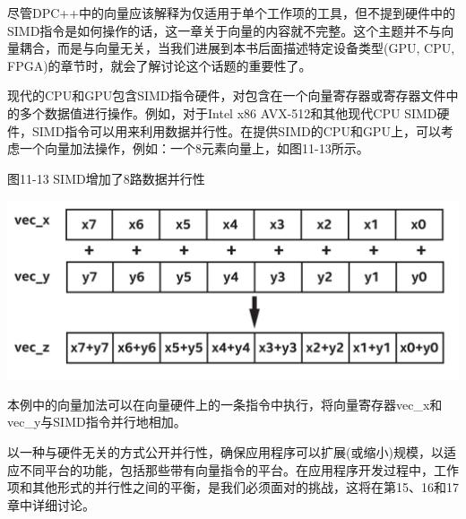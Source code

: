 尽管DPC++中的向量应该解释为仅适用于单个工作项的工具，但不提到硬件中的SIMD指令是如何操作的话，这一章关于向量的内容就不完整。这个主题并不与向量耦合，而是与向量无关，当我们进展到本书后面描述特定设备类型(GPU, CPU, FPGA)的章节时，就会了解讨论这个话题的重要性了。\par

现代的CPU和GPU包含SIMD指令硬件，对包含在一个向量寄存器或寄存器文件中的多个数据值进行操作。例如，对于Intel x86 AVX-512和其他现代CPU SIMD硬件，SIMD指令可以用来利用数据并行性。在提供SIMD的CPU和GPU上，可以考虑一个向量加法操作，例如：一个8元素向量上，如图11-13所示。\par

\hspace*{\fill} \par %
图11-13 SIMD增加了8路数据并行性
\begin{center}
	\includegraphics[width=1.0\textwidth]{content/chapter-11/images/2}
\end{center}

本例中的向量加法可以在向量硬件上的一条指令中执行，将向量寄存器vec\_x和vec\_y与SIMD指令并行地相加。\par

以一种与硬件无关的方式公开并行性，确保应用程序可以扩展(或缩小)规模，以适应不同平台的功能，包括那些带有向量指令的平台。在应用程序开发过程中，工作项和其他形式的并行性之间的平衡，是我们必须面对的挑战，这将在第15、16和17章中详细讨论。\par













